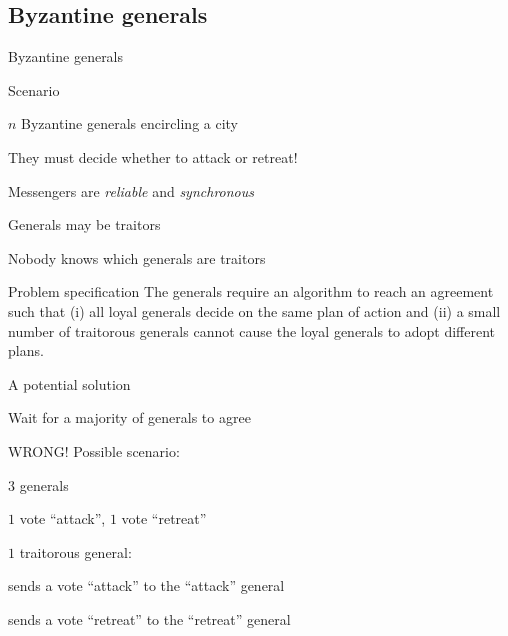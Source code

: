 \subsection{Byzantine generals}

\begin{frame}{Byzantine generals}
\begin{block}{Scenario}
\BI
\item $n$ Byzantine generals encircling a city
\item They must decide whether to attack or retreat!
\item Messengers are \emph{reliable} and \emph{synchronous}
\item Generals may be traitors
\item Nobody knows which generals are traitors
\EI	
\end{block}

\begin{block}{Problem specification}
The generals require an algorithm to reach an agreement such that (i) all loyal generals decide on the same plan of action and (ii) a small number of traitorous generals cannot cause the loyal generals to adopt different plans.
\end{block}

\end{frame}

\begin{frame}{A potential solution}

\BI
\item Wait for a majority of generals to agree
\EI

\pause
\bigskip
WRONG! Possible scenario:
\BI
\item $3$ generals
\item $1$ vote “attack”, $1$ vote “retreat”
\item $1$ traitorous general:
\BI
\item sends a vote “attack” to the “attack” general
\item sends a vote “retreat” to the “retreat” general
\EI
\EI

\end{frame}

